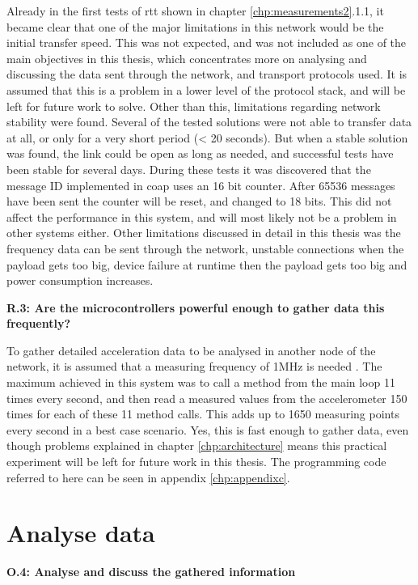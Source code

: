 \noindent Already in the first tests of \gls{rtt} shown in chapter \ref{chp:measurements2}.1.1, it became clear that one of the major limitations in this network would be the initial transfer speed. This was not expected, and was not included as one of the main objectives in this thesis, which concentrates more on analysing and discussing the data sent through the network, and transport protocols used. It is assumed that this is a problem in a lower level of the protocol stack, and will be left for future work to solve. Other than this, limitations regarding network stability were found. Several of the tested solutions were not able to transfer data at all, or only for a very short period (< 20 seconds). But when a stable solution was found, the link could be open as long as needed, and successful tests have been stable for several days. During these tests it was discovered that the message ID implemented in \gls{coap} uses an 16 bit counter. After 65536 messages have been sent the counter will be reset, and changed to 18 bits. This did not affect the performance in this system, and will most likely not be a problem in other systems either. Other limitations discussed in detail in this thesis was the frequency data can be sent through the network, unstable connections when the \gls{payload} gets too big, device failure at runtime then the \gls{payload} gets too big and power consumption increases. 

\noindent\textbf{R.3: Are the microcontrollers powerful enough to gather data this frequently?}

\noindent To gather detailed acceleration data to be analysed in another node of the network, it is assumed that a measuring frequency of 1MHz is needed . The maximum achieved in this system was to call a method from the main loop 11 times every second, and then read a measured values from the accelerometer 150 times for each of these 11 method calls. This adds up to 1650 measuring points every second in a best case scenario. Yes, this is fast enough to gather data, even though problems explained in chapter \ref{chp:architecture} means this practical experiment will be left for future work in this thesis. The programming code referred to here can be seen in appendix \ref{chp:appendixc}. 


\section{Analyse data}

\noindent\textbf{O.4: Analyse and discuss the gathered information}

